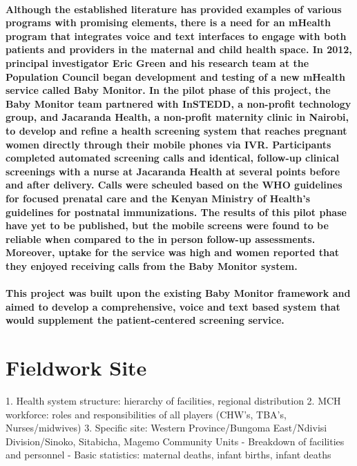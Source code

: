 \paragraph{Although the established literature has provided examples of various programs with promising elements, there is a need for an mHealth program that integrates voice and text interfaces to engage with both patients and providers in the maternal and child health space. In 2012, principal investigator Eric Green and his research team at the Population Council began development and testing of a new mHealth service called Baby Monitor. In the pilot phase of this project, the Baby Monitor team partnered with InSTEDD, a non-profit technology group, and Jacaranda Health, a non-profit maternity clinic in Nairobi, to develop and refine a health screening system that reaches pregnant women directly through their mobile phones via IVR. Participants completed automated screening calls and identical, follow-up clinical screenings with a nurse at Jacaranda Health at several points before and after delivery. Calls were scheuled based on the WHO guidelines for focused prenatal care and the Kenyan Ministry of Health's guidelines for postnatal immunizations. The results of this pilot phase have yet to be published, but the mobile screens were found to be reliable when compared to the in person follow-up assessments. Moreover, uptake for the service was high and women reported that they enjoyed receiving calls from the Baby Monitor system.}

\paragraph{This project was built upon the existing Baby Monitor framework and aimed to develop a comprehensive, voice and text based system that would supplement the patient-centered screening service.}


\section{Fieldwork Site}
1. Health system structure: hierarchy of facilities, regional distribution
2. MCH workforce: roles and responsibilities of all players (CHW's, TBA's, Nurses/midwives)
3. Specific site: Western Province/Bungoma East/Ndivisi Division/Sinoko, Sitabicha, Magemo Community Units
- Breakdown of facilities and personnel
- Basic statistics: maternal deaths, infant births, infant deaths



